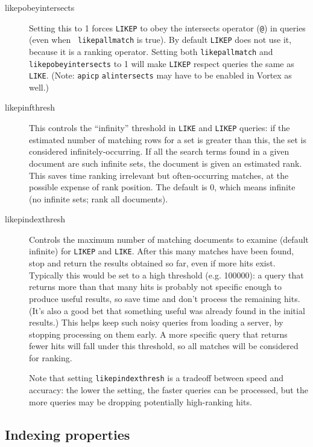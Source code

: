 \begin{description}
\item[likepobeyintersects] Setting this to 1 forces \verb`LIKEP` to
  obey the intersects operator ({\tt @}) in queries (even when {\tt
    likepallmatch} is true).  By default \verb`LIKEP` does not use it,
  because it is a ranking operator.  Setting both \verb`likepallmatch`
  and \verb`likepobeyintersects` to 1 will make \verb`LIKEP` respect
  queries the same as \verb`LIKE`. (Note: \verb`apicp`
  \verb`alintersects` may have to be enabled in Vortex as well.)

\item[likepinfthresh] This controls the ``infinity'' threshold in
  \verb`LIKE` and \verb`LIKEP` queries: if the estimated number of
  matching rows for a set is greater than this, the set is considered
  infinitely-occurring.  If all the search terms found in a given
  document are such infinite sets, the document is given an estimated
  rank.  This saves time ranking irrelevant but often-occurring
  matches, at the possible expense of rank position.  The default is
  0, which means infinite (no infinite sets; rank all documents).

\item[likepindexthresh]
  Controls the maximum number of matching documents to examine
(default infinite) for \verb`LIKEP` and \verb`LIKE`.  After this many
matches have been found, stop and return the results obtained so far,
even if more hits exist.  Typically this would be set to a high
threshold (e.g. 100000): a query that returns more than that many hits
is probably not specific enough to produce useful results, so save
time and don't process the remaining hits.  (It's also a good bet that
something useful was already found in the initial results.)  This
helps keep such noisy queries from loading a server, by stopping
processing on them early.  A more specific query that returns fewer
hits will fall under this threshold, so all matches will be considered
for ranking.

  Note that setting \verb`likepindexthresh` is a tradeoff between
speed and accuracy: the lower the setting, the faster queries can be
processed, but the more queries may be dropping potentially
high-ranking hits.
\end{description}

\subsection{Indexing properties}
\label{sec:indexprop}

